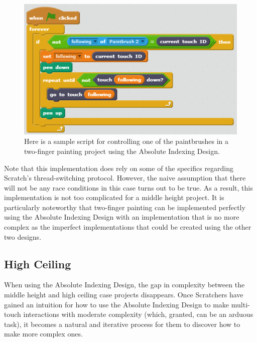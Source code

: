 \begin{figure}
\centering
\includegraphics{images/TwoFingerPaintingAID.PNG}
\caption[Sample Absolute Indexing Design Script For Two Finger Painting]
{Here is a sample script for controlling one of the paintbrushes in a two-finger painting project using the Absolute Indexing Design.}
\label{TwoFingerPaintingAID}
\end{figure}

Note that this implementation does rely on some of the specifics regarding Scratch's thread-switching protocol. However, the naive assumption that there will not be any race conditions in this case turns out to be true. As a result, this implementation is not too complicated for a middle height project. It is particularly noteworthy that two-finger painting can be implemented perfectly using the Absolute Indexing Design with an implementation that is no more complex as the imperfect implementations that could be created using the other two designs.

\subsection{High Ceiling}

When using the Absolute Indexing Design, the gap in complexity between the middle height and high ceiling case projects disappears. Once Scratchers have gained an intuition for how to use the Absolute Indexing Design to make multi-touch interactions with moderate complexity (which, granted, can be an arduous task), it becomes a natural and iterative process for them to discover how to make more complex ones.

